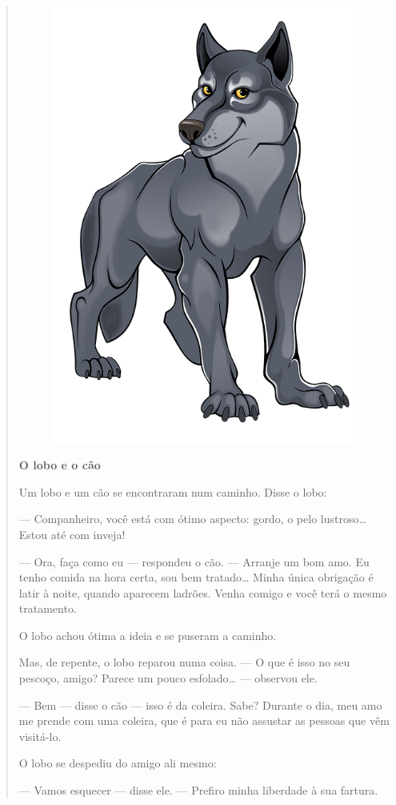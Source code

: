 \begin{quote}
\begin{figure}
\includegraphics[width=.5\textwidth]{media/image22.png}
\end{figure}

\textbf{O lobo e o cão}

Um lobo e um cão se encontraram num caminho. Disse o lobo:

--- Companheiro, você está com ótimo aspecto: gordo, o pelo
lustroso\ldots{} Estou até com inveja!

--- Ora, faça como eu --- respondeu o cão. --- Arranje um bom amo. Eu
tenho comida na hora certa, sou bem tratado\ldots{} Minha única
obrigação é latir à noite, quando aparecem ladrões. Venha comigo e você
terá o mesmo tratamento.

O lobo achou ótima a ideia e se puseram a caminho.

Mas, de repente, o lobo reparou numa coisa. --- O que é isso no seu
pescoço, amigo? Parece um pouco esfolado\ldots{} --- observou ele.

--- Bem --- disse o cão --- isso é da coleira. Sabe? Durante o dia,
meu amo me prende com uma coleira, que é para eu não assustar as pessoas
que vêm visitá-lo.

O lobo se despediu do amigo ali mesmo:

--- Vamos esquecer --- disse ele. --- Prefiro minha liberdade à sua
fartura.

\end{quote}

